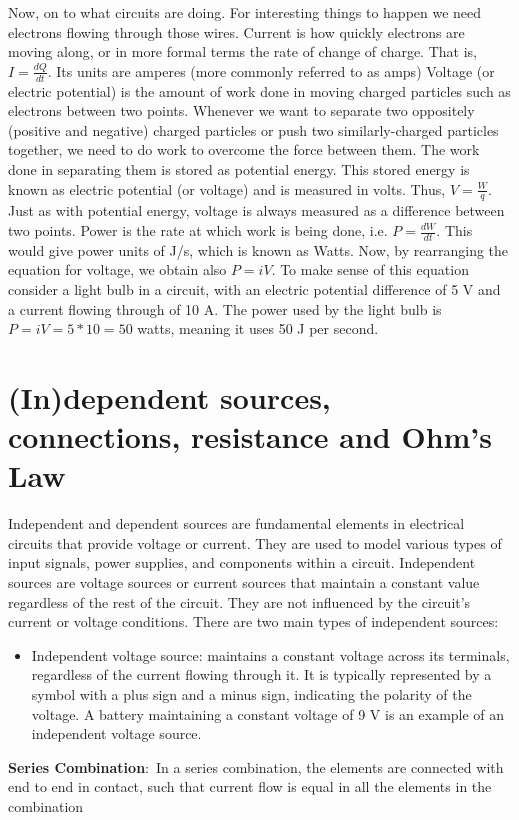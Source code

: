 \documentclass[nobib]{tufte-handout}
\newcommand{\defn}[2]{\noindent\textbf{#1}:\ #2}
\begin{document}
Now, on to what circuits are doing. For interesting things
to happen we need electrons flowing through those wires.
Current is how quickly
electrons are moving along, or in more formal terms the rate of
change of charge. That is, $I = \frac{dQ}{dt}$. Its units are amperes (more commonly referred to as amps)
Voltage (or electric potential) is the amount of work done in moving charged 
particles such as electrons between two points. Whenever we want to separate 
two oppositely (positive and negative) charged particles or push two similarly-charged
particles together, we need to do
work to overcome the force between them. The work done in 
separating them is stored as potential energy.
This stored energy is known as electric potential (or voltage) and is measured in volts.
Thus, $V = \frac{W}{q}$. Just as with potential energy, voltage is always 
measured as a difference between two points. Power is the rate at which work is being done,
i.e. $P = \frac{dW}{dt}$. This would give power units of J/s, which
is known as Watts. Now, by rearranging the equation for voltage, we obtain also
$P=iV$. To make sense of this equation consider a light bulb in a circuit, with an electric potential difference of
5 V and a current flowing through of 10 A. The power used by the light bulb is 
$P=iV = 5 * 10 = 50$ watts, meaning it uses 50 J per second. 

\section{(In)dependent sources, connections, resistance and Ohm's Law}
Independent and dependent sources are fundamental elements in 
electrical circuits that provide voltage or current. 
They are used to model various types of input signals, 
power supplies, and components within a circuit.
Independent sources are voltage sources or current sources 
that maintain a constant value regardless of the rest of the 
circuit. They are not influenced by the circuit's current or 
voltage conditions. There are two main types of independent 
sources:
\begin{itemize}
    \item[] Independent voltage source: maintains a constant 
    voltage across its terminals, regardless of the current 
    flowing through it. It is typically represented by a 
    symbol with a plus sign and a minus sign, indicating 
    the polarity of the voltage. A battery maintaining a constant
    voltage of 9 V is an example of an independent voltage source. 
\end{itemize}
\defn{Series Combination}{In a series combination, the elements 
are connected with end to end in contact, such that 
current flow is equal in all the elements in the 
combination}
\end{document}
